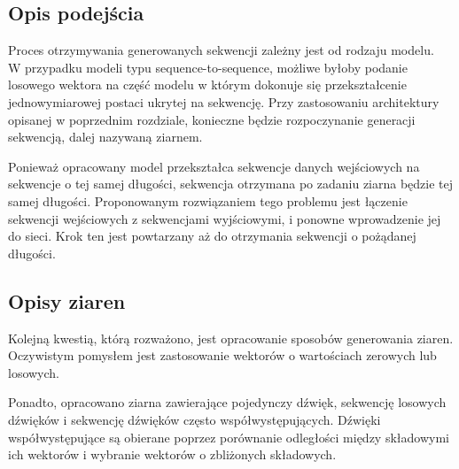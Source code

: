 {{        \subsection{Opis podejścia}
        {
            Proces otrzymywania generowanych sekwencji zależny jest od rodzaju modelu.
            W\,\,przypadku modeli typu sequence-to-sequence, możliwe byłoby podanie losowego 
            wektora na część modelu w\,\,którym dokonuje się przekształcenie jednowymiarowej postaci ukrytej na sekwencję.
            Przy zastosowaniu architektury opisanej w\,\,poprzednim rozdziale, konieczne będzie 
            rozpoczynanie generacji sekwencją, dalej nazywaną ziarnem. 

            Ponieważ opracowany model przekształca sekwencje danych wejściowych na sekwencje
            o\,\,tej samej długości, sekwencja otrzymana po zadaniu ziarna będzie tej samej długości.
            Proponowanym rozwiązaniem tego problemu jest łączenie sekwencji wejściowych z\,\,sekwencjami wyjściowymi,
            i\,\,ponowne wprowadzenie jej do sieci. Krok ten jest powtarzany aż do otrzymania sekwencji o\,\,pożądanej długości.
        }

        \subsection{Opisy ziaren}
        {
            Kolejną kwestią, którą rozważono, jest opracowanie sposobów generowania ziaren.
            Oczywistym pomysłem jest zastosowanie wektorów o\,\,wartościach zerowych lub losowych.

            Ponadto, opracowano ziarna zawierające pojedynczy dźwięk, sekwencję losowych dźwięków
            i\,\,sekwencję dźwięków często współwystępujących. Dźwięki współwystępujące są obierane poprzez
            porównanie odległości między składowymi ich wektorów i\,\,wybranie wektorów o\,\,zbliżonych składowych.
        }
    }
}